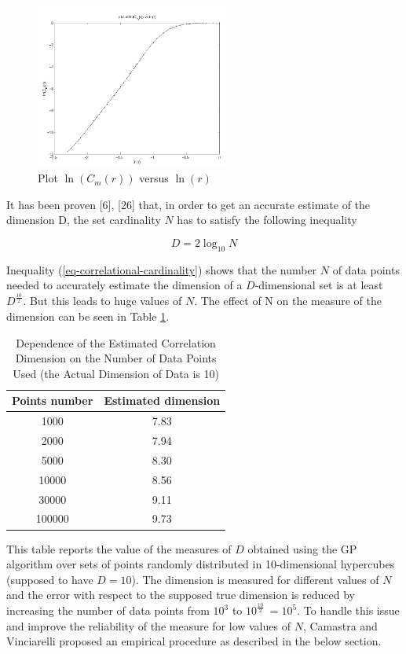 \documentclass[journal]{IEEEtran}
\begin{document}
\begin{figure}[!t]
  \centering
  \includegraphics[width=2.5in]{fig-3.png}
  \caption{Plot \(\ln(C_m(r))\) versus \(\ln(r)\)}
  \label{fig_plot_correlation}
\end{figure}

It has been proven [6], [26] that, in order to get an accurate 
estimate of the dimension D, the set cardinality \(N\) has to satisfy the following inequality

\begin{equation}
  \label{eq-correlational-cardinality}
  D = 2\log_{10}N
\end{equation}

Inequality (\ref{eq-correlational-cardinality}) shows that the number \(N\) of data points needed to 
accurately estimate the dimension of a \(D\)-dimensional set is at least \(D^{\frac{10}{2}}\).
But this leads to huge values of \(N\).
The effect of N on the measure of the dimension can be seen in
Table \ref{tbl_effect_of_n}.

\begin{table}[!t]
  \renewcommand{\arraystretch}{2.5}
  \caption{Dependence of the Estimated Correlation Dimension on the Number of Data Points Used (the Actual Dimension of Data is 10)}
  \label{tbl_effect_of_n}
  \centering
  \begin{tabular}{c||c}
  \hline
  \bfseries Points number & \bfseries Estimated dimension\\
  \hline\hline
  1000 & 7.83\\
  2000 & 7.94\\
  5000 & 8.30\\
  10000 & 8.56\\
  30000 & 9.11\\
  100000 & 9.73\\
  \hline
  \end{tabular}
\end{table}
  

This table reports the value of the measures of \(D\) obtained using the GP algorithm over sets of points randomly distributed in
10-dimensional hypercubes (supposed to have \(D = 10\)). The dimension is measured for different values of \(N\) and the error 
with respect to the supposed true dimension is reduced by increasing the number of data points from \(10^3\) to \(10^\frac{10}{2}\ = 10^5\).
To handle this issue and improve the reliability of the measure for low values of \(N\), Camastra and Vinciarelli proposed an empirical procedure 
as described in the below section.
\end{document}
